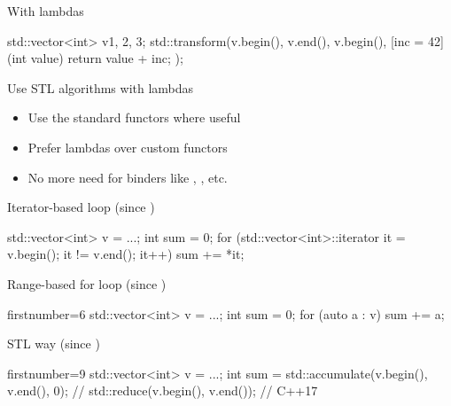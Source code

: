 \begin{frame}[fragile]
  \begin{exampleblock}{With lambdas}
    \begin{cppcode*}{}
      std::vector<int> v{1, 2, 3};
      std::transform(v.begin(), v.end(), v.begin(),
                     [inc = 42](int value) {
                       return value + inc;
                     });
    \end{cppcode*}
  \end{exampleblock}
  \pause
  \begin{goodpractice}{Use STL algorithms with lambdas}
    \begin{itemize}
      \item Use the standard functors where useful
      \item Prefer lambdas over custom functors
      \item No more need for binders like , , etc.
    \end{itemize}
  \end{goodpractice}
\end{frame}

\begin{frame}[fragile]
  \begin{block}{Iterator-based loop (since )}
    \begin{cppcode*}{}
      std::vector<int> v = ...;
      int sum = 0;
      for (std::vector<int>::iterator it = v.begin();
           it != v.end(); it++)
        sum += *it;
    \end{cppcode*}
  \end{block}
  \pause
  \begin{block}{Range-based for loop (since )}
    \begin{cppcode*}{firstnumber=6}
      std::vector<int> v = ...;
      int sum = 0;
      for (auto a : v) { sum += a; }
    \end{cppcode*}
  \end{block}
  \pause
  \begin{exampleblock}{STL way (since )}
    \begin{cppcode*}{firstnumber=9}
      std::vector<int> v = ...;
      int sum = std::accumulate(v.begin(), v.end(), 0);
      // std::reduce(v.begin(), v.end()); // C++17
    \end{cppcode*}
  \end{exampleblock}
\end{frame}

